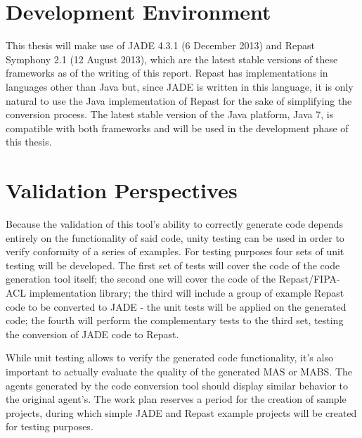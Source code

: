 \section{Development Environment}

This thesis will make use of JADE 4.3.1 (6 December 2013) and Repast Symphony 2.1 (12 August 2013), which are the latest stable versions of these frameworks as of the writing of this report. Repast has implementations in languages other than Java but, since JADE is written in this language, it is only natural to use the Java implementation of Repast for the sake of simplifying the conversion process. The latest stable version of the Java platform, Java 7, is compatible with both frameworks and will be used in the development phase of this thesis.

\section{Validation Perspectives}

Because the validation of this tool's ability to correctly generate code depends entirely on the functionality of said code, unity testing can be used in order to verify conformity of a series of examples. For testing purposes four sets of unit testing will be developed.
The first set of tests will cover the code of the code generation tool itself;
the second one will cover the code of the Repast/FIPA-ACL implementation library;
the third will include a group of example Repast code to be converted to JADE - the unit tests will be applied on the generated code;
the fourth will perform the complementary tests to the third set, testing the conversion of JADE code to Repast.

While unit testing allows to verify the generated code functionality, it's also important to actually evaluate the quality of the generated MAS or MABS. The agents generated by the code conversion tool should display similar behavior to the original agent's. The work plan reserves a period for the creation of sample projects, during which simple JADE and Repast example projects will be created for testing purposes.

